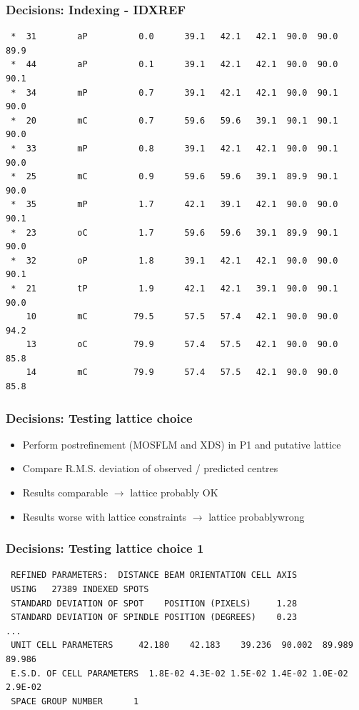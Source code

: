 \documentclass[slides,compress]{beamer}
\begin{document}
\begin{frame}[fragile]
\frametitle{Decisions: Indexing - IDXREF}
{\small
\begin{verbatim}
 *  31        aP          0.0      39.1   42.1   42.1  90.0  90.0  89.9
 *  44        aP          0.1      39.1   42.1   42.1  90.0  90.0  90.1
 *  34        mP          0.7      39.1   42.1   42.1  90.0  90.1  90.0
 *  20        mC          0.7      59.6   59.6   39.1  90.1  90.1  90.0
 *  33        mP          0.8      39.1   42.1   42.1  90.0  90.1  90.0
 *  25        mC          0.9      59.6   59.6   39.1  89.9  90.1  90.0
 *  35        mP          1.7      42.1   39.1   42.1  90.0  90.0  90.1
 *  23        oC          1.7      59.6   59.6   39.1  89.9  90.1  90.0
 *  32        oP          1.8      39.1   42.1   42.1  90.0  90.0  90.1
 *  21        tP          1.9      42.1   42.1   39.1  90.0  90.1  90.0
    10        mC         79.5      57.5   57.4   42.1  90.0  90.0  94.2
    13        oC         79.9      57.4   57.5   42.1  90.0  90.0  85.8
    14        mC         79.9      57.4   57.5   42.1  90.0  90.0  85.8
\end{verbatim}
}
\end{frame}

\begin{frame}
\frametitle{Decisions: Testing lattice choice}
\begin{itemize}
\item{Perform postrefinement (MOSFLM and XDS) in P1 and putative lattice}
\item{Compare R.M.S. deviation of observed / predicted centres}
\item{Results comparable $\rightarrow$ lattice probably OK}
\item{Results worse with lattice constraints $\rightarrow$ lattice probablywrong}
\end{itemize}
\end{frame}

\begin{frame}[fragile]
\frametitle{Decisions: Testing lattice choice 1}
{\small
\begin{verbatim}
 REFINED PARAMETERS:  DISTANCE BEAM ORIENTATION CELL AXIS                   
 USING   27389 INDEXED SPOTS
 STANDARD DEVIATION OF SPOT    POSITION (PIXELS)     1.28
 STANDARD DEVIATION OF SPINDLE POSITION (DEGREES)    0.23
...
 UNIT CELL PARAMETERS     42.180    42.183    39.236  90.002  89.989  89.986
 E.S.D. OF CELL PARAMETERS  1.8E-02 4.3E-02 1.5E-02 1.4E-02 1.0E-02 2.9E-02
 SPACE GROUP NUMBER      1
\end{verbatim}
}
\end{frame}
\end{document}
